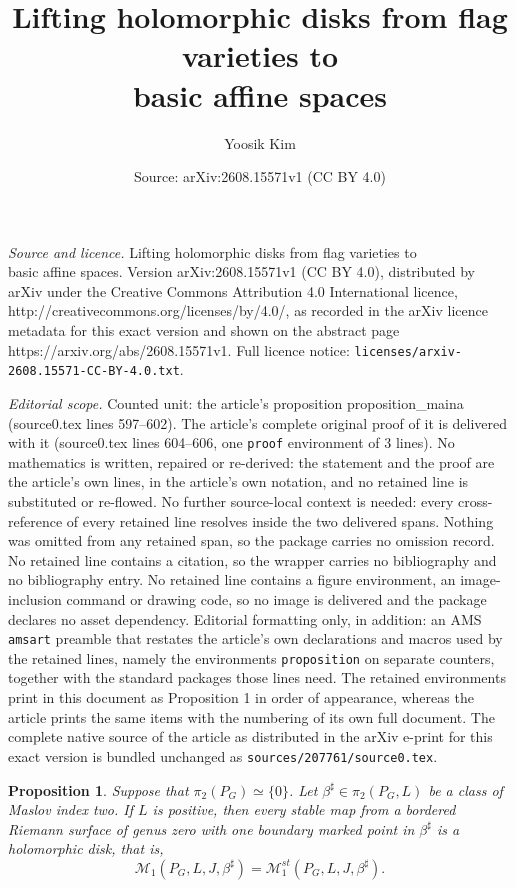 \documentclass[10pt,a4paper]{amsart}
\title{Lifting holomorphic disks from flag varieties to\\ basic affine spaces}
\author{Yoosik Kim}
\date{Source: arXiv:2608.15571v1 (CC BY 4.0)}
\newtheorem{proposition}{Proposition}
\begin{document}
\maketitle

\noindent\emph{Source and licence.} Lifting holomorphic disks from flag varieties to\\ basic affine spaces. Version arXiv:2608.15571v1 (CC BY 4.0), distributed by arXiv under the Creative Commons Attribution 4.0 International licence, http://creativecommons.org/licenses/by/4.0/, as recorded in the arXiv licence metadata for this exact version and shown on the abstract page https://arxiv.org/abs/2608.15571v1. Full licence notice: \texttt{licenses/arxiv-2608.15571-CC-BY-4.0.txt}.\par\smallskip

\noindent\textit{Editorial scope.} Counted unit: the article's proposition proposition\_maina (source0.tex lines 597--602). The article's complete original proof of it is delivered with it (source0.tex lines 604--606, one \texttt{proof} environment of 3 lines). No mathematics is written, repaired or re-derived: the statement and the proof are the article's own lines, in the article's own notation, and no retained line is substituted or re-flowed.  No further source-local context is needed: every cross-reference of every retained line resolves inside the two delivered spans.  Nothing was omitted from any retained span, so the package carries no omission record.  No retained line contains a citation, so the wrapper carries no bibliography and no bibliography entry.  No retained line contains a figure environment, an image-inclusion command or drawing code, so no image is delivered and the package declares no asset dependency.  Editorial formatting only, in addition: an AMS \texttt{amsart} preamble that restates the article's own declarations and macros used by the retained lines, namely the environments \texttt{proposition} on separate counters, together with the standard packages those lines need.  The retained environments print in this document as Proposition 1 in order of appearance, whereas the article prints the same items with the numbering of its own full document.  The complete native source of the article as distributed in the arXiv e-print for this exact version is bundled unchanged as \texttt{sources/207761/source0.tex}.
\begin{proposition}\label{proposition_maina}
Suppose that $\pi_2(P_G) \simeq \{0\}$. Let $\beta^\sharp \in \pi_2(P_G,L)$ be a class of Maslov index two. If $L$ is positive, then every stable map from a bordered Riemann surface of genus zero with one boundary marked point in $\beta^\sharp$ is a holomorphic disk, that is, 
$$
\mathcal{M}_1(P_G, L, J, \beta^\sharp) = \mathcal{M}^{st}_1(P_G, L, J, \beta^\sharp).
$$
\end{proposition}
\end{document}
